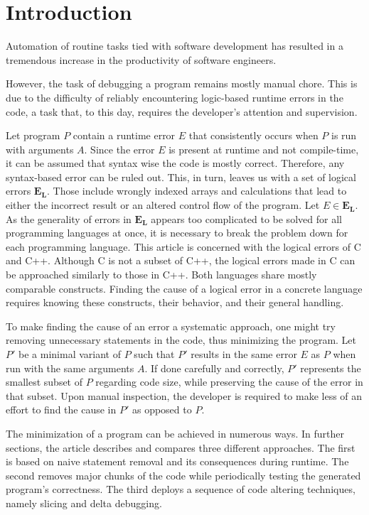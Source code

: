 \chapter*{Introduction}

Automation of routine tasks tied with software development has resulted in a tremendous
increase in the productivity of software engineers. 

However, the task of debugging a program
remains mostly manual chore. 
This is due to the difficulty of reliably encountering logic-based
runtime errors in the code, a task that, to this day, requires 
the developer's attention and supervision.

\par

Let program $P$ contain a runtime error $E$ that consistently occurs
when $P$ is run with arguments $A$.
Since the error $E$ is present at runtime and not compile-time,
it can be assumed that syntax wise the code is mostly correct.
Therefore, any syntax-based error can be ruled out.
This, in turn, leaves us with a set of logical errors $\mathbf{E_L}$.
Those include wrongly indexed arrays and calculations that lead to either
the incorrect result or an altered control flow of the program. 
Let $E \in \mathbf{E_L}$. As the generality of errors in $\mathbf{E_L}$ appears
too complicated to be solved for all programming languages at once, it is necessary to 
break the problem down for each programming language. 
This article is concerned with the logical errors of C and C++.
Although C is not a subset of C++, the logical errors made in C can be
approached similarly to those in C++.
Both languages share mostly comparable constructs.
Finding the cause of a logical error in a concrete language requires knowing
these constructs, their behavior, and their general handling.

To make finding the cause of an error a systematic approach, one might try removing
unnecessary statements in the code, thus minimizing the program.
Let $P'$ be a minimal variant of $P$ such that $P'$ results in the same error $E$ as $P$
when run with the same arguments $A$.
If done carefully and correctly, $P'$ represents the smallest subset of $P$ regarding code
size, while preserving the cause of the error in that subset.
Upon manual inspection, the developer is required to make less of an effort to find
the cause in $P'$ as opposed to $P$.

The minimization of a program can be achieved in numerous ways.
In further sections, the article describes and compares three different approaches.
The first is based on naive statement removal and its consequences during runtime.
The second removes major chunks of the code while
periodically testing the generated program's correctness.
The third deploys a sequence of code
altering techniques, namely slicing and delta debugging.

